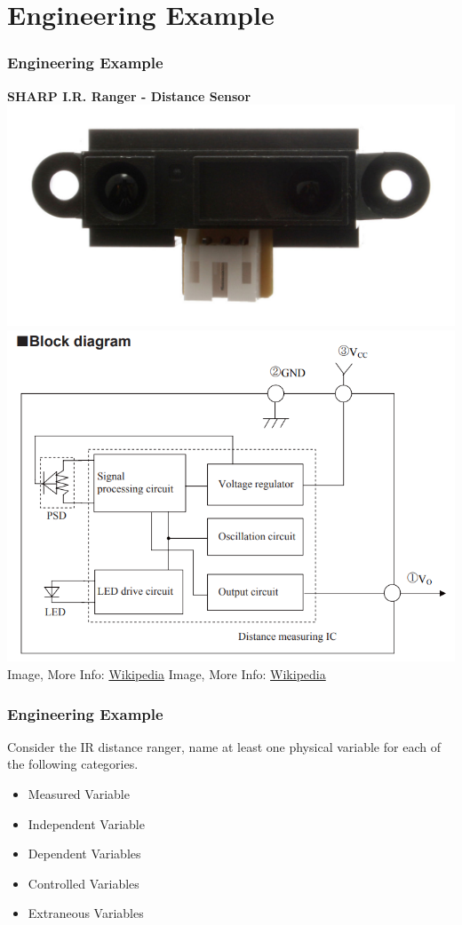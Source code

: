 \documentclass[fleqn]{beamer} %
\newcommand{\sectiontitleV}{Engineering Example}
\begin{document}
\section{\sectiontitleV}
\begin{frame}[label=sectionV]
\frametitle{\sectiontitleV}


	\textbf{ SHARP I.R. Ranger - Distance Sensor} \vspc
	\includegraphics[scale=0.5]{proximity_sensor.jpg} \hspace{20mm}\includegraphics[scale=0.20]{sharp_ranger_circuit.png} \vspc
  {\tiny Image, More Info: \href{https://en.wikipedia.org/wiki/Proximity_sensor}{Wikipedia} }\hspace{40mm} {\tiny Image, More Info: \href{https://en.wikipedia.org/wiki/Position_sensitive_device}{Wikipedia} }

\end{frame}

\begin{frame}
\frametitle{Engineering Example}


Consider the IR distance ranger, name at least one physical variable for each of the following categories. 

\begin{itemize}
	\item Measured Variable \vspc 
	\item Independent Variable \vspc
	\item Dependent Variables  \vspc 
	\item Controlled Variables  \vspc 
	\item Extraneous Variables  \vspc 
\end{itemize}

\end{frame}
\end{document}
